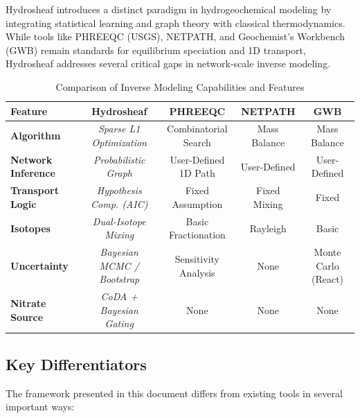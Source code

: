 \documentclass[12pt,a4paper]{article}
\theoremstyle{plain}
\theoremstyle{definition}
\theoremstyle{remark}
\begin{document}
Hydrosheaf introduces a distinct paradigm in hydrogeochemical modeling by integrating statistical learning and graph theory with classical thermodynamics. While tools like PHREEQC (USGS), NETPATH, and Geochemist's Workbench (GWB) remain standards for equilibrium speciation and 1D transport, Hydrosheaf addresses several critical gaps in network-scale inverse modeling.

\begin{table}[htbp]
	\centering
	\caption{Comparison of Inverse Modeling Capabilities and Features}
	\label{tab:software_comparison}
	\begin{tabularx}{\textwidth}{@{} l C C C C @{}}
		\toprule
		\textbf{Feature}           & \textbf{Hydrosheaf}                & \textbf{PHREEQC}     & \textbf{NETPATH} & \textbf{GWB}        \\
		\midrule
		\textbf{Algorithm}         & \textit{Sparse L1 Optimization}    & Combinatorial Search & Mass Balance     & Mass Balance        \\ \addlinespace
		\textbf{Network Inference} & \textit{Probabilistic Graph}       & User-Defined 1D Path & User-Defined     & User-Defined        \\ \addlinespace
		\textbf{Transport Logic}   & \textit{Hypothesis Comp. (AIC)}    & Fixed Assumption     & Fixed Mixing     & Fixed               \\ \addlinespace
		\textbf{Isotopes}          & \textit{Dual-Isotope Mixing}       & Basic Fractionation  & Rayleigh         & Basic               \\ \addlinespace
		\textbf{Uncertainty}       & \textit{Bayesian MCMC / Bootstrap} & Sensitivity Analysis & None             & Monte Carlo (React) \\ \addlinespace
		\textbf{Nitrate Source}    & \textit{CoDA + Bayesian Gating}    & None                 & None             & None                \\
		\bottomrule
	\end{tabularx}
\end{table}

\subsection{Key Differentiators}

The framework presented in this document differs from existing tools in several important ways:
\end{document}
